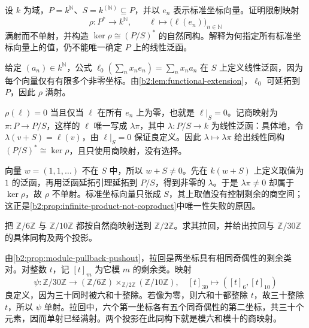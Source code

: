 \begin{exercise}\label{b2:ex:05-infinite-product-not-coproduct}
	设 \(k\) 为域，\(P=k^{\mathbb N}\)、\(S=k^{(\mathbb N)}\subseteq P\)，并以 \(e_n\) 表示标准坐标向量。证明限制映射
	\[
		\rho:P^*\longrightarrow k^{\mathbb N},\qquad \ell\longmapsto\bigl(\ell(e_n)\bigr)_{n\in\mathbb N}
	\]
	满射而不单射，并构造 \(\ker\rho\cong(P/S)^*\) 的自然同构。解释为何指定所有标准坐标向量上的值，仍不能唯一确定 \(P\) 上的线性泛函。
\end{exercise}
\begin{solution}
	给定 \((a_n)\in k^{\mathbb N}\)，公式 \(\ell_0(\sum_n x_ne_n)=\sum_n x_na_n\) 在 \(S\) 上定义线性泛函，因为每个向量仅有有限多个非零坐标。由\cref{b2:lem:functional-extension}，\(\ell_0\) 可延拓到 \(P\)，因此 \(\rho\) 满射。

	\(\rho(\ell)=0\) 当且仅当 \(\ell\) 在所有 \(e_n\) 上为零，也就是 \(\ell|_S=0\)。记商映射为 \(\pi:P\rightarrow P/S\)，这样的 \(\ell\) 唯一写成 \(\lambda\pi\)，其中 \(\lambda:P/S\rightarrow k\) 为线性泛函：具体地，令 \(\lambda(v+S)=\ell(v)\)，由 \(\ell|_S=0\) 保证良定义。因此 \(\lambda\mapsto\lambda\pi\) 给出线性同构 \((P/S)^*\cong\ker\rho\)，且只使用商映射，没有选择。

	向量 \(w=(1,1,\ldots)\) 不在 \(S\) 中，所以 \(w+S\ne0\)。先在 \(k(w+S)\) 上定义取值为 \(1\) 的泛函，再用泛函延拓引理延拓到 \(P/S\)，得到非零的 \(\lambda\)。于是 \(\lambda\pi\ne0\) 却属于 \(\ker\rho\)，故 \(\rho\) 不单射。标准坐标向量只张成 \(S\)，其上取值没有控制剩余的商空间；这正是\cref{b2:prop:infinite-product-not-coproduct}中唯一性失败的原因。
\end{solution}

\begin{exercise}\label{b2:ex:05-pullback-congruences}
	把 \(\mathbb Z/6\mathbb Z\) 与 \(\mathbb Z/10\mathbb Z\) 都按自然商映射送到 \(\mathbb Z/2\mathbb Z\)。求其拉回，并给出拉回与 \(\mathbb Z/30\mathbb Z\) 的具体同构及两个投影。
\end{exercise}
\begin{solution}
	由\cref{b2:prop:module-pullback-pushout}，拉回是两坐标具有相同奇偶性的剩余类对。对整数 \(t\)，记 \([t]_m\) 为它模 \(m\) 的剩余类。映射
	\[
		\psi:\mathbb Z/30\mathbb Z\longrightarrow (\mathbb Z/6\mathbb Z)\times_{\mathbb Z/2\mathbb Z}(\mathbb Z/10\mathbb Z), \quad [t]_{30}\longmapsto([t]_6,[t]_{10})
	\]
	良定义，因为三十同时被六和十整除。若像为零，则六和十都整除 \(t\)，故三十整除 \(t\)，所以 \(\psi\) 单射。拉回中，六个第一坐标各有五个同奇偶性的第二坐标，共三十个元素，因而单射已经满射。两个投影在此同构下就是模六和模十的商映射。
\end{solution}

